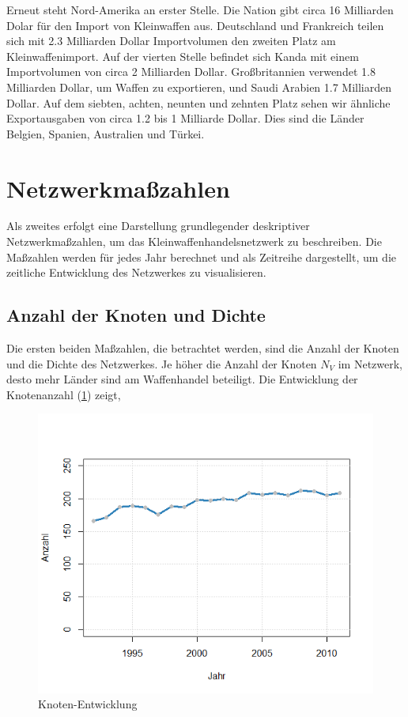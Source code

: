 \documentclass[a4paper,ngerman,oneside,titlepage,bibliography=totoc,11pt]{scrreprt}
\begin{document}
Erneut steht Nord-Amerika an erster Stelle. Die Nation gibt circa 16 Milliarden Dolar für den Import von Kleinwaffen aus. Deutschland und Frankreich teilen sich mit 2.3 Milliarden Dollar Importvolumen den zweiten Platz am Kleinwaffenimport. Auf der vierten Stelle befindet sich Kanda mit einem Importvolumen von circa 2 Milliarden Dollar. Großbritannien verwendet 1.8 Milliarden Dollar, um Waffen zu exportieren, und Saudi Arabien 1.7 Milliarden Dollar. Auf dem siebten, achten, neunten und zehnten Platz sehen wir ähnliche Exportausgaben von circa 1.2 bis 1 Milliarde Dollar. Dies sind die Länder Belgien, Spanien, Australien und Türkei.

\section{Netzwerkmaßzahlen}

Als zweites erfolgt eine Darstellung grundlegender deskriptiver Netzwerkmaßzahlen, um das Kleinwaffenhandelsnetzwerk zu beschreiben. Die Maßzahlen werden für jedes Jahr berechnet und als Zeitreihe dargestellt, um die zeitliche Entwicklung des Netzwerkes zu visualisieren. 

\subsection{Anzahl der Knoten und Dichte}
Die ersten beiden Maßzahlen, die betrachtet werden, sind die Anzahl der Knoten und die Dichte des Netzwerkes. Je höher die Anzahl der Knoten $N_V$ im Netzwerk, desto mehr Länder sind am Waffenhandel beteiligt. Die Entwicklung der Knotenanzahl (\ref{vert_ts}) zeigt,

\begin{figure}[ht]
	\centering
  \includegraphics[scale = 1]{Grafiken/vert_ts.png}
	\caption{Knoten-Entwicklung}
	\label{vert_ts}
\end{figure}
\end{document}
